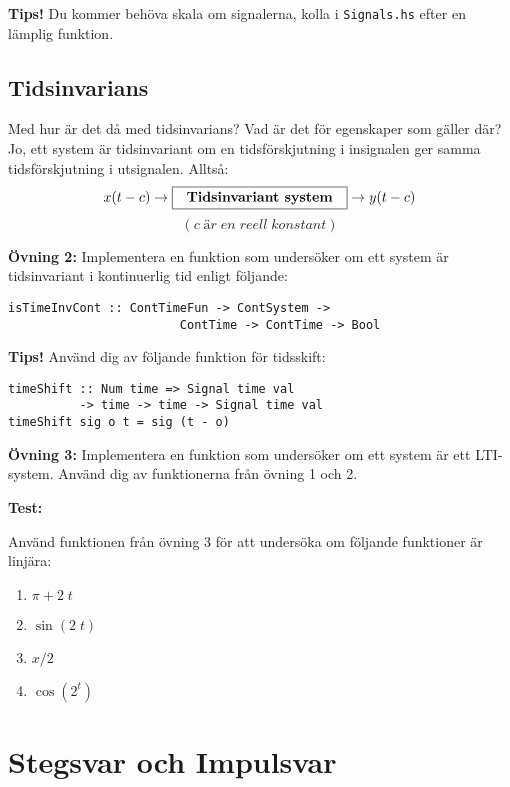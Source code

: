 \documentclass{article}
\begin{document}
\textbf{Tips!} Du kommer behöva skala om signalerna, kolla i {\tt Signals.hs} efter en
lämplig funktion.

\subsection{Tidsinvarians}
Med hur är det då med tidsinvarians? Vad är det för egenskaper som gäller
där? Jo, ett system är tidsinvariant om en tidsförskjutning i insignalen ger samma tidsförskjutning i utsignalen. Alltså:
$$x(t-c) \rightarrow \framebox[1.2\width]{\textbf{Tidsinvariant system}} \rightarrow y(t-c) $$
 $$(c\; är\; en\; reell\; konstant)$$

\textbf{Övning 2:} Implementera en funktion som undersöker om ett system är tidsinvariant i kontinuerlig tid enligt följande:

\begin{verbatim}
isTimeInvCont :: ContTimeFun -> ContSystem ->
                        ContTime -> ContTime -> Bool

\end{verbatim}

\textbf{Tips!} Använd dig av följande funktion för tidsskift:

\begin{verbatim}
timeShift :: Num time => Signal time val
          -> time -> time -> Signal time val
timeShift sig o t = sig (t - o)
\end{verbatim}

\textbf{Övning 3:} Implementera en funktion som undersöker om ett system är ett LTI-system. Använd dig av funktionerna från övning 1 och 2.

\textbf{Test:}


Använd funktionen från övning 3 för att undersöka om följande funktioner är linjära:
\begin{enumerate}
\item $\pi + 2\;t$
\item $\sin(2\;t)$
\item $x/2$
\item $\cos(2^t)$
\end{enumerate}

\section{Stegsvar och Impulsvar}
\end{document}
